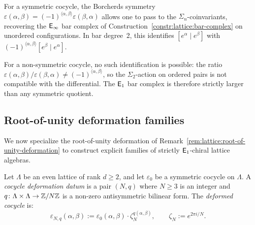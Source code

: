 \begin{remark}
\label{rem:e1-vs-einf-bar}
For a symmetric cocycle, the Borcherds symmetry
$\varepsilon(\alpha,\beta) =
(-1)^{\langle\alpha,\beta\rangle}\varepsilon(\beta,\alpha)$
allows one to pass to the $\Sigma_n$-coinvariants, recovering the
$\mathsf{E}_{\infty}$ bar complex of Construction~\ref{constr:lattice:bar-complex}
on unordered configurations.  In bar degree~2, this identifies
$[e^\alpha \mid e^\beta]$ with
$(-1)^{\langle\alpha,\beta\rangle} [e^\beta \mid e^\alpha]$.

For a non-symmetric cocycle, no such identification is possible: the
ratio $\varepsilon(\alpha,\beta)/\varepsilon(\beta,\alpha) \neq
(-1)^{\langle\alpha,\beta\rangle}$, so the $\Sigma_2$-action
on ordered pairs is not compatible with the differential.  The
$\mathsf{E}_1$ bar complex is therefore strictly larger than any symmetric
quotient.
\end{remark}


\subsection{Root-of-unity deformation families}

We now specialize the root-of-unity deformation of
Remark~\ref{rem:lattice:root-of-unity-deformation} to construct
explicit families of strictly $\mathsf{E}_1$-chiral lattice algebras.

\begin{definition}\label{def:lattice:cocycle-deformation}
Let $\Lambda$ be an even lattice of rank $d \geq 2$, and let
$\varepsilon_0$ be a symmetric cocycle on $\Lambda$.  A
\emph{cocycle deformation datum} is a pair $(N, q)$ where $N \geq 3$
is an integer and $q \colon \Lambda \times \Lambda \to \mathbb{Z}/N\mathbb{Z}$ is a
non-zero antisymmetric bilinear form.  The
\emph{deformed cocycle} is:
\begin{equation}\label{eq:lattice:deformed-cocycle}
\varepsilon_{N,q}(\alpha, \beta)
:= \varepsilon_0(\alpha, \beta) \cdot
   \zeta_N^{q(\alpha,\beta)},
\qquad \zeta_N := e^{2\pi i/N}.
\end{equation}
\end{definition}

